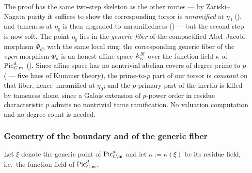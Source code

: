 The proof has the same two-step skeleton as the other routes --- by
Zariski--Nagata purity it suffices to show the corresponding torsor is
\emph{unramified} at $\eta_0$ (), and
tameness at $\eta_0$ is then upgraded to unramifiedness
() --- but the second step is now
soft. The point $\eta_0$ lies in the \emph{generic fiber} of the compactified
Abel--Jacobi morphism $\tilde{\Phi}_d$, with the same local ring; the
corresponding generic fiber of the \emph{open} morphism $\Phi_d$ is an honest
affine space $\A^N_\kappa$ over the function field $\kappa$ of $\PicCm[d]$
(). Since affine space has no
nontrivial abelian covers of degree prime to $p$
( --- five lines of Kummer theory), the
prime-to-$p$ part of our torsor is \emph{constant} on that fiber, hence
unramified at $\eta_0$; and the $p$-primary part of the inertia is killed by
tameness alone, since a Galois extension of $p$-power order in residue
characteristic $p$ admits no nontrivial tame ramification. No valuation
computation and no degree count is needed.

\subsubsection*{Geometry of the boundary and of the generic fiber}

Let $\xi$ denote the generic point of $\PicCm[d]$ and let
$\kappa := \kappa(\xi)$ be its residue field, i.e.\ the function field of
$\PicCm[d]$.


